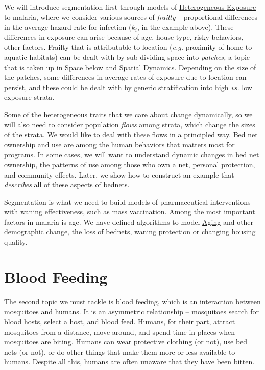 \documentclass[
]{book}
\begin{document}
We will introduce segmentation first through models of \protect\hyperlink{heterogeneous-exposure}{Heterogeneous Exposure} to malaria, where we consider various sources of \emph{frailty} -- proportional differences in the average hazard rate for infection (\(k_i\), in the example above). These differences in exposure can arise because of age, house type, risky behaviors, other factors. Frailty that is attributable to location (\emph{e.g.} proximity of home to aquatic habitats) can be dealt with by sub-dividing space into \emph{patches,} a topic that is taken up in \protect\hyperlink{space}{Space} below and \protect\hyperlink{spatial-dynamics}{Spatial Dynamics}. Depending on the size of the patches, some differences in average rates of exposure due to location can persist, and these could be dealt with by generic stratification into high \emph{vs.} low exposure strata.

Some of the heterogeneous traits that we care about change dynamically, so we will also need to consider population \emph{flows} among strata, which change the sizes of the strata. We would like to deal with these flows in a principled way. Bed net ownership and use are among the human behaviors that matters most for programs. In some cases, we will want to understand dynamic changes in bed net ownership, the patterns of use among those who own a net, personal protection, and community effects. Later, we show how to construct an example that \emph{describes} all of these aspects of bednets.

Segmentation is what we need to build models of pharmaceutical interventions with waning effectiveness, such as mass vaccination. Among the most important factors in malaria is age. We have defined algorithms to model \protect\hyperlink{aging}{Aging} and other demographic change, the loss of bednets, waning protection or changing housing quality.

\hypertarget{blood-feeding}{%
\section{Blood Feeding}\label{blood-feeding}}

The second topic we must tackle is blood feeding, which is an interaction between mosquitoes and humans. It is an asymmetric relationship -- mosquitoes search for blood hosts, select a host, and blood feed. Humans, for their part, attract mosquitoes from a distance, move around, and spend time in places when mosquitoes are biting. Humans can wear protective clothing (or not), use bed nets (or not), or do other things that make them more or less available to humans. Despite all this, humans are often unaware that they have been bitten.
\end{document}
